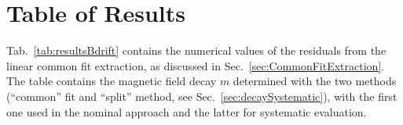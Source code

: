 \section{Table of Results}

Tab.~\ref{tab:resultsBdrift} contains the numerical values of the residuals from the linear common fit extraction, as discussed in Sec.~\ref{sec:CommonFitExtraction}. The table contains the magnetic field decay $m$ determined with the two methods (``common'' fit and ``split'' method, see Sec.~\ref{sec:decaySystematic}), with the first one used in the nominal approach and the latter for systematic evaluation.

\begin{table}[h]
\centering
{}
\caption{$B$-drift correction parameters and residuals from the common linear fit. The $\Delta t (s)$ value is the time interval between the \fcb and \fda measurement.
\label{tab:resultsBdrift}}
\end{table}


